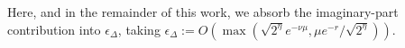 \documentclass[aps,floatfix,10pt,amssymb,amsfont,amsmath,superscriptaddress,float,nofootinbib,longbibliography,nobalancelastpage,twocolumn]{revtex4-2}
\begin{document}
Here, and in the remainder of this work, we absorb the imaginary-part contribution into $\epsilon_{\Delta}$, taking $\epsilon_{\Delta} := O(\max(\sqrt{2^{\eta}}e^{-\nu\mu},\mu e^{-r}/\sqrt{2^{\eta}}))$.






\end{document}

